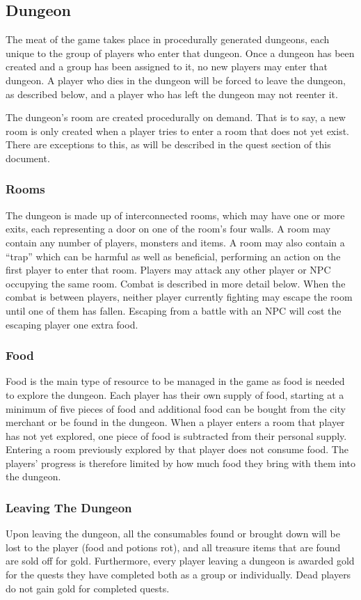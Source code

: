 \documentclass[a4paper]{article}
\begin{document}
\subsection{Dungeon}
The meat of the game takes place in procedurally generated dungeons, each unique to the group of players who enter that dungeon. Once a dungeon has been created and a group has 
been assigned to it, no new players may enter that dungeon. A player who dies in the dungeon will be forced to leave the dungeon, as described below, and a player who has left the dungeon 
may not reenter it.

The dungeon's room are created procedurally on demand. That is to say, a new room is only created when a player tries to enter a room that does not yet exist. There are exceptions to 
this, as will be described in the quest section of this document.
\subsubsection{Rooms}
The dungeon is made up of interconnected rooms, which may have one or more exits, each representing a door on one of the room's four walls. A room may contain any number of players, monsters 
and items. A room may also contain a ``trap'' which can be harmful as well as beneficial, performing an action on the first player to enter that room. Players may attack any other player or 
NPC occupying the same room. Combat is described in more detail below. When the combat is between players, neither player currently fighting may escape the room until one of them has fallen. 
Escaping from a battle with an NPC will cost the escaping player one extra food.
\subsubsection{Food}
Food is the main type of resource to be managed in the game as food is needed to explore the dungeon. Each player has their own supply of food, starting at a minimum of five pieces of food 
and additional food can be bought from the city merchant or be found in the dungeon. When a player enters a room that player has not yet explored, one piece of food is subtracted from their 
personal supply. Entering a room previously explored by that player does not consume food. The players' progress is therefore limited by how much food they bring with them into the dungeon.
\subsubsection{Leaving The Dungeon}
Upon leaving the dungeon, all the consumables found or brought down will be lost to the player (food and potions rot), and all treasure items that are found are sold off for gold. 
Furthermore, every player leaving a dungeon is awarded gold for the quests they have completed both as a group or individually. Dead players do not gain gold for completed quests.
\end{document}
